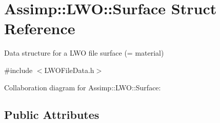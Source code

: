 \hypertarget{struct_assimp_1_1_l_w_o_1_1_surface}{\section{Assimp\+:\+:L\+W\+O\+:\+:Surface Struct Reference}
\label{struct_assimp_1_1_l_w_o_1_1_surface}
}


Data structure for a L\+W\+O file surface (= material)  




{\ttfamily \#include $<$L\+W\+O\+File\+Data.\+h$>$}



Collaboration diagram for Assimp\+:\+:L\+W\+O\+:\+:Surface\+:
\subsection*{Public Attributes}
